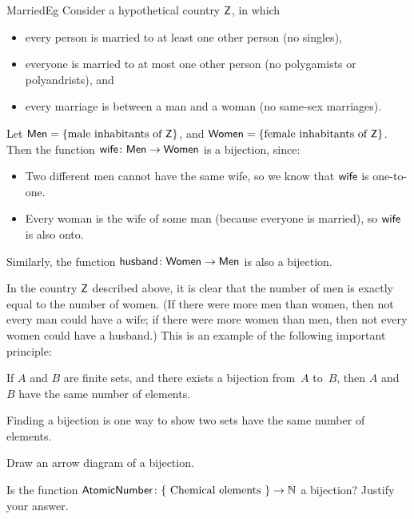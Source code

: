  \begin{example}{MarriedEg}
 Consider a hypothetical country $\sf{Z}$, in which 
 \begin{itemize}
 \item every person is married to at least one other person (no singles),
\item everyone is married to at most one other person (no polygamists or polyandrists),
 and
 \item every marriage is between a man and a woman (no same-sex marriages). 
 \end{itemize}
Let ${\sf{M}en} = \{\text{male inhabitants of } \sf{Z}\}$, and 
${\sf{W}omen} = \{\text{female inhabitants of } \sf{Z}\}$.
Then the function $\sf{wife} \colon \sf{Men} \to \sf{Women}$ is a bijection, since:
\begin{itemize}
 \item Two different men cannot have the same wife, so we know that $\sf{wife}$ is one-to-one. 
 \item Every woman is the wife of some man (because everyone is married), so $\sf{wife}$ is also onto.
 \end{itemize}
Similarly, the function $\sf{husband} \colon \sf{Women} \to \sf{Men}$ is also a bijection.
 \end{example}

\begin{rem}
In the country $\sf{Z}$ described above, it is clear that the number of men is exactly equal to the number of women. (If there were more men than women, then not every man could have a wife; if there were more women than men, then not every women could have a husband.) This is an example of the following important principle:
	
\begin{center}
If $A$ and $B$ are finite sets, and there exists a bijection from~$A$ to~$B$, 
	then $A$ and~$B$ have
	 the same number of elements.
\end{center}

Finding a bijection is one way to show two sets have the same number of elements.
\end{rem}

\begin{exercise}{}
Draw an arrow diagram of a bijection.
\end{exercise}

\begin{exercise}{}
Is the function $\sf{Atomic Number} \colon \{ \mbox{ Chemical elements } \} \to \mathbb{N}$ a bijection?  Justify your answer.
\end{exercise}


